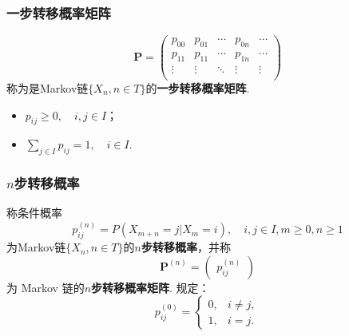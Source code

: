 \begin{frame}
    \frametitle{一步转移概率矩阵}
    \begin{mydefinition}
        \begin{equation}
            \bm P=
            \begin{pmatrix}
                p_{00} & p_{01} & \cdots & p_{0n} & \cdots\\
                p_{11} & p_{11} & \cdots & p_{1n} & \cdots\\
                \vdots & \vdots & \ddots & \vdots & \vdots\\
            \end{pmatrix}
        \end{equation}
        称为是Markov链$\{X_n,n\in T\}$的\textbf{一步转移概率矩阵}.
    \end{mydefinition}
    \begin{myproposition}[一步转移概率矩阵的性质]
        \begin{itemize}
            \item $p_{ij}\geqslant 0,\quad i,j\in I$；
            \item $\displaystyle\sum_{j\in I}p_{ij}=1,\quad i\in I$.
        \end{itemize}
    \end{myproposition}
\end{frame}

\begin{frame}
    \frametitle{$n$步转移概率}
    \begin{mydefinition}[$n$步转移概率]
        称条件概率
        \begin{equation}
            p_{ij}^{(n)}=P(X_{m+n}=j|X_m=i),\quad i,j\in I,m\geqslant 0,n\geqslant 1
        \end{equation}
        为Markov链$\{X_n,n\in T\}$的\textbf{$n$步转移概率}，并称
        \begin{equation}
            \bm P^{(n)}=
            \begin{pmatrix}
                p_{ij}^{(n)}
            \end{pmatrix}
        \end{equation}
        为 Markov 链的\textbf{$n$步转移概率矩阵}.
        规定：
        \begin{equation}
            p_{ij}^{(0)}=
            \begin{cases}
                0,&i\neq j,\\
                1,&i=j.
            \end{cases}
        \end{equation}
    \end{mydefinition}
\end{frame}

